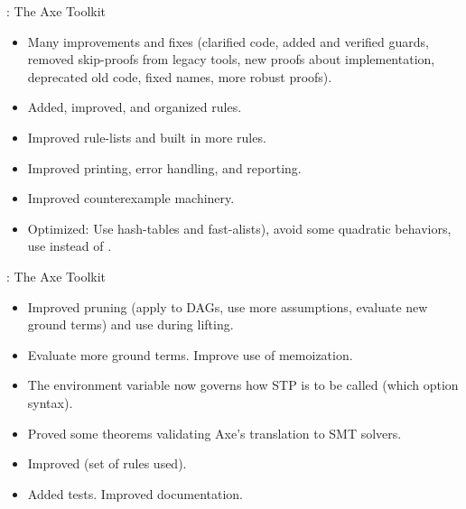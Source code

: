 \begin{frame}

\implibtitle

:
The Axe Toolkit
\begin{itemize}
\item Many improvements and fixes (clarified code, added and verified guards, removed skip-proofs from legacy tools, new proofs about implementation, deprecated old code, fixed names, more robust proofs).
\item Added, improved, and organized rules.
\item Improved rule-lists and built in more rules.
\item Improved printing, error handling, and reporting.
\item Improved counterexample machinery.
\item Optimized: Use hash-tables and fast-alists), avoid some quadratic behaviors, use  instead of .
\end{itemize}

\end{frame}


\begin{frame}

\implibtitle

:
The Axe Toolkit
\begin{itemize}
\item Improved pruning (apply to DAGs, use more assumptions, evaluate new ground terms) and use during lifting.
\item Evaluate more ground terms.  Improve use of memoization.
\item The  environment variable now governs how STP is to be called (which option syntax).
\item Proved some theorems validating Axe's translation to SMT solvers.
\item Improved  (set of rules used).
\item Added tests.  Improved documentation.
\end{itemize}

\end{frame}


